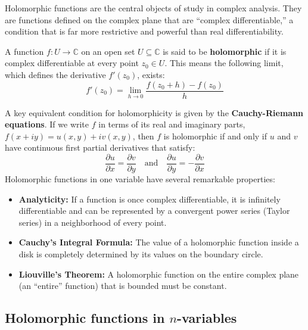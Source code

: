 \documentclass{article}
\begin{document}
Holomorphic functions are the central objects of study in complex analysis. They are functions defined on the complex plane that are ``complex differentiable,'' a condition that is far more restrictive and powerful than real differentiability.
\begin{definition}
A function $f: U \to \mathbb{C}$ on an open set $U \subseteq \mathbb{C}$ is said to be \textbf{holomorphic} if it is complex differentiable at every point $z_0 \in U$. This means the following limit, which defines the derivative $f'(z_0)$, exists:
\[ f'(z_0) = \lim_{h \to 0} \frac{f(z_0+h) - f(z_0)}{h} \]
\end{definition}
A key equivalent condition for holomorphicity is given by the \textbf{Cauchy-Riemann equations}. If we write $f$ in terms of its real and imaginary parts, $f(x+iy) = u(x,y) + iv(x,y)$, then $f$ is holomorphic if and only if $u$ and $v$ have continuous first partial derivatives that satisfy:
\[ \frac{\partial u}{\partial x} = \frac{\partial v}{\partial y} \quad \text{and} \quad \frac{\partial u}{\partial y} = -\frac{\partial v}{\partial x} \]
Holomorphic functions in one variable have several remarkable properties:
\begin{itemize}
    \item \textbf{Analyticity:} If a function is once complex differentiable, it is infinitely differentiable and can be represented by a convergent power series (Taylor series) in a neighborhood of every point.
    \item \textbf{Cauchy's Integral Formula:} The value of a holomorphic function inside a disk is completely determined by its values on the boundary circle.
    \item \textbf{Liouville's Theorem:} A holomorphic function on the entire complex plane (an ``entire'' function) that is bounded must be constant.
\end{itemize}

\subsection{Holomorphic functions in $n$-variables}
\end{document}
